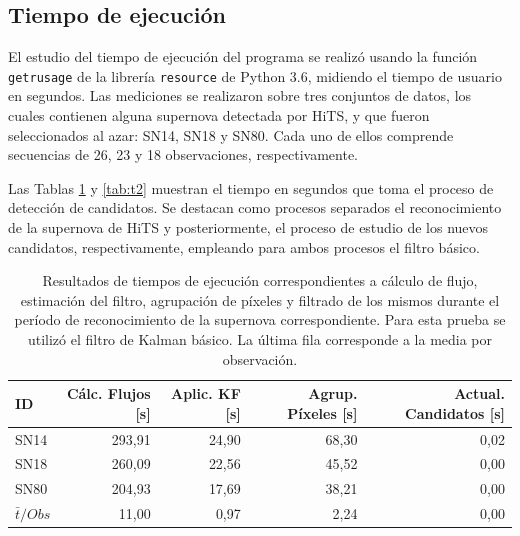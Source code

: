 \subsection{Tiempo de ejecuci\'on}

El estudio del tiempo de ejecuci\'on del programa se realiz\'o usando la funci\'on \texttt{getrusage} de la librer\'ia \texttt{resource} de Python 3.6, midiendo el tiempo de usuario en segundos. Las mediciones se realizaron sobre tres conjuntos de datos, los cuales contienen alguna supernova detectada por HiTS, y que fueron seleccionados al azar: SN14, SN18 y  SN80. Cada uno de ellos comprende secuencias de 26, 23 y 18 observaciones, respectivamente. 
\bigskip

Las Tablas \ref{tab:t1} y \ref{tab:t2} muestran el tiempo en segundos que toma el proceso de detecci\'on de candidatos. Se destacan como procesos separados el reconocimiento de la supernova de HiTS y posteriormente, el proceso de estudio de los nuevos candidatos, respectivamente, empleando para ambos procesos el filtro b\'asico.  

\begin{table}[h!]
\centering
\caption{Resultados de tiempos de ejecuci\'on correspondientes a c\'alculo de flujo, estimaci\'on del filtro, agrupaci\'on de p\'ixeles y filtrado de los mismos durante el per\'iodo de reconocimiento de la supernova correspondiente. Para esta prueba se utiliz\'o el filtro de Kalman b\'asico. La \'ultima fila corresponde a la media por observaci\'on.}
\begin{tabular}{|l|r|r|r|r|}
\hline
\textbf{ID} & \textbf{C\'alc. Flujos [s]} & \textbf{Aplic. KF [s]} &  \textbf{Agrup. P\'ixeles [s]}  & \textbf{Actual. Candidatos [s]}\\ \hline \hline
SN14        & 293,91            & 24,90        &  68,30 & 0,02 \\ \hline
SN18            & 260,09             & 22,56         &  45,52  & 0,00\\ \hline
SN80            & 204,93             & 17,69         &   38,21 & 0,00 \\ \hline \hline
$\bar{t}/Obs$ & 11,00 &  0,97 & 2,24 & 0,00\\\hline 
\end{tabular}
\label{tab:t1}
\end{table}

